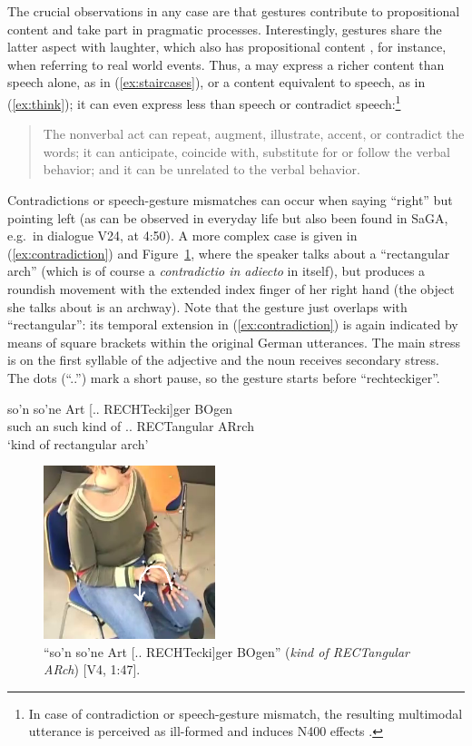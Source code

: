 \documentclass[output=paper]{langsci/langscibook}
\begin{document}
The crucial observations in any case are that gestures contribute to propositional content and take part in pragmatic processes.
%
Interestingly, gestures share the latter aspect with laughter, which also has propositional content \citep{Ginzburg:Breitholz:Cooper:Hough:Tian:2015}, for instance, when referring to real world events.
%
Thus, a  may express a richer content than speech alone, as in (\ref{ex:staircases}), or a content equivalent to speech, as in (\ref{ex:think}); it can even express less than speech or contradict speech:\footnote{In case of contradiction or speech-gesture mismatch, the resulting multimodal utterance is perceived as ill-formed and induces N400 effects \citep{Wu:Coulson:2005,Kelly:Kravitz:Hopkins:2004}.} 
%
\begin{quote}
The nonverbal act can repeat, augment, illustrate, accent, or contradict the words; it can anticipate, coincide with, substitute for or follow the verbal behavior; and it can be unrelated to the verbal behavior.\hfill 
\citep[53]{Ekman:Friesen:1969}
\end{quote}

Contradictions or speech-gesture mismatches can occur when saying \enquote{right} but pointing left (as can be observed in everyday life but also been found in SaGA, e.g.\ in dialogue V24, at 4:50).
%
A more complex case is given in (\ref{ex:contradiction}) and Figure~\ref{fig:contradiction}, where the speaker talks about a \enquote{rectangular arch} (which is of course a \textit{contradictio in adiecto} in itself), but produces a roundish movement with the extended index finger of her right hand (the object she talks about is an archway).
%
Note that the gesture just overlaps with \enquote{rectangular}: its temporal extension in (\ref{ex:contradiction}) is again indicated by means of square brackets within the original German utterances. 
%
The main stress is on the first syllable of the adjective and the noun receives secondary stress.
%
The dots (\enquote{..}) mark a short pause, so the gesture starts before \enquote{rechteckiger}.

\ea \label{ex:contradiction}
\gll 
 so'n so'ne Art {[.. RECHTecki]ger} BOgen \\
{such an} such {kind of} {.. RECTangular} ARrch \\
\glt 
\enquote*{kind of rectangular arch}
\z

\begin{figure}
  \centering
  \includegraphics[trim={2cm 0 0 3cm}, clip, width=5cm]{figures/rechteckiger-Bogen}
  \caption[Rectangular arch]{\enquote{so'n so'ne Art [.. RECHTecki]ger BOgen} (\textit{kind of RECTangular ARch}) [V4, 1:47].}
  \label{fig:contradiction}
\end{figure}
\end{document}
